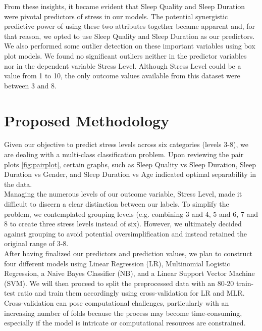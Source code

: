 \documentclass[11pt, letterpaper]{article}
\begin{document}
    \noindent From these insights, it became evident that Sleep Quality and Sleep Duration were pivotal predictors of stress in our models. The potential synergistic predictive power of using these two attributes together became apparent and, for that reason, we opted to use Sleep Quality and Sleep Duration as our predictors.\\
    
    \noindent We also performed some outlier detection on these important variables using box plot models. We found no significant outliers neither in the predictor variables nor in the dependent variable Stress Level. Although Stress Level could be a value from 1 to 10, the only outcome values available from this dataset were between 3 and 8.\\
    
    \section*{Proposed Methodology}
    \noindent Given our objective to predict stress levels across six categories (levels 3-8), we are dealing with a multi-class classification problem. Upon reviewing the pair plots \ref{fig:pairplot}, certain graphs, such as Sleep Quality vs Sleep Duration, Sleep Duration vs Gender, and Sleep Duration vs Age indicated optimal separability in the data.\\

    \noindent Managing the numerous levels of our outcome variable, Stress Level, made it difficult to discern a clear distinction between our labels. To simplify the problem, we contemplated grouping levels (e.g. combining 3 and 4, 5 and 6, 7 and 8 to create three stress levels instead of six). However, we ultimately decided against grouping to avoid potential oversimplification and instead retained the original range of 3-8.\\

    \noindent After having finalized our predictors and prediction values, we plan to construct four different models using Linear Regression (LR), Multinomial Logistic Regression, a Naive Bayes Classifier (NB), and a Linear Support Vector Machine (SVM). We will then proceed to split the preprocessed data with an 80-20 train-test ratio and train them accordingly using cross-validation for LR and MLR. Cross-validation can pose computational challenges, particularly with an increasing number of folds because the process may become time-consuming, especially if the model is intricate or computational resources are constrained.\\
\end{document}
